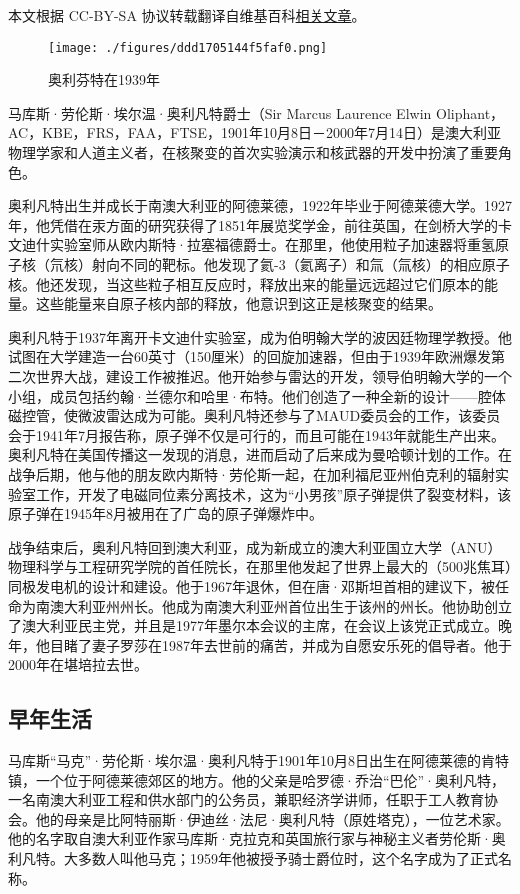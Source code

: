 
本文根据 CC-BY-SA 协议转载翻译自维基百科\href{https://en.wikipedia.org/wiki/Mark_Oliphant}{相关文章}。

\begin{figure}[ht]
\centering
\texttt{[image: ./figures/ddd1705144f5faf0.png]}
\caption{奥利芬特在1939年} \label{fig_MKalft_1}
\end{figure}
马库斯·劳伦斯·埃尔温·奥利凡特爵士（Sir Marcus Laurence Elwin Oliphant，AC，KBE，FRS，FAA，FTSE，1901年10月8日－2000年7月14日）是澳大利亚物理学家和人道主义者，在核聚变的首次实验演示和核武器的开发中扮演了重要角色。

奥利凡特出生并成长于南澳大利亚的阿德莱德，1922年毕业于阿德莱德大学。1927年，他凭借在汞方面的研究获得了1851年展览奖学金，前往英国，在剑桥大学的卡文迪什实验室师从欧内斯特·拉塞福德爵士。在那里，他使用粒子加速器将重氢原子核（氘核）射向不同的靶标。他发现了氦-3（氦离子）和氚（氚核）的相应原子核。他还发现，当这些粒子相互反应时，释放出来的能量远远超过它们原本的能量。这些能量来自原子核内部的释放，他意识到这正是核聚变的结果。

奥利凡特于1937年离开卡文迪什实验室，成为伯明翰大学的波因廷物理学教授。他试图在大学建造一台60英寸（150厘米）的回旋加速器，但由于1939年欧洲爆发第二次世界大战，建设工作被推迟。他开始参与雷达的开发，领导伯明翰大学的一个小组，成员包括约翰·兰德尔和哈里·布特。他们创造了一种全新的设计——腔体磁控管，使微波雷达成为可能。奥利凡特还参与了MAUD委员会的工作，该委员会于1941年7月报告称，原子弹不仅是可行的，而且可能在1943年就能生产出来。奥利凡特在美国传播这一发现的消息，进而启动了后来成为曼哈顿计划的工作。在战争后期，他与他的朋友欧内斯特·劳伦斯一起，在加利福尼亚州伯克利的辐射实验室工作，开发了电磁同位素分离技术，这为“小男孩”原子弹提供了裂变材料，该原子弹在1945年8月被用在了广岛的原子弹爆炸中。

战争结束后，奥利凡特回到澳大利亚，成为新成立的澳大利亚国立大学（ANU）物理科学与工程研究学院的首任院长，在那里他发起了世界上最大的（500兆焦耳）同极发电机的设计和建设。他于1967年退休，但在唐·邓斯坦首相的建议下，被任命为南澳大利亚州州长。他成为南澳大利亚州首位出生于该州的州长。他协助创立了澳大利亚民主党，并且是1977年墨尔本会议的主席，在会议上该党正式成立。晚年，他目睹了妻子罗莎在1987年去世前的痛苦，并成为自愿安乐死的倡导者。他于2000年在堪培拉去世。
\subsection{早年生活}
马库斯“马克”·劳伦斯·埃尔温·奥利凡特于1901年10月8日出生在阿德莱德的肯特镇，一个位于阿德莱德郊区的地方。他的父亲是哈罗德·乔治“巴伦”·奥利凡特，一名南澳大利亚工程和供水部门的公务员，兼职经济学讲师，任职于工人教育协会。他的母亲是比阿特丽斯·伊迪丝·法尼·奥利凡特（原姓塔克），一位艺术家。他的名字取自澳大利亚作家马库斯·克拉克和英国旅行家与神秘主义者劳伦斯·奥利凡特。大多数人叫他马克；1959年他被授予骑士爵位时，这个名字成为了正式名称。

